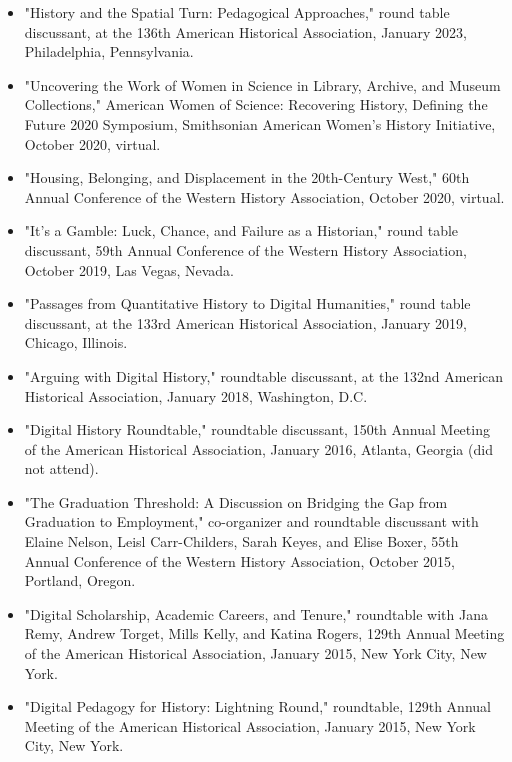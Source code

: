 \documentclass[10pt]{article}
\begin{document}
\begin{itemize}
  \item "History and the Spatial Turn: Pedagogical Approaches," round table discussant, at the 136th American Historical Association, January 2023, Philadelphia, Pennsylvania.
  
  \item "Uncovering the Work of Women in Science in Library, Archive, and Museum Collections," American Women of Science: Recovering History, Defining the Future 2020 Symposium, Smithsonian American Women's History Initiative, October 2020, virtual.
  
  \item "Housing, Belonging, and Displacement in the 20th-Century West," 60th Annual Conference of the Western History Association, October 2020, virtual.
  
  \item "It's a Gamble: Luck, Chance, and Failure as a Historian," round table discussant, 59th Annual Conference of the Western History Association, October 2019, Las Vegas, Nevada.
  
  \item "Passages from Quantitative History to Digital Humanities," round table discussant, at the 133rd American Historical Association, January 2019, Chicago, Illinois.
  
  \item "Arguing with Digital History," roundtable discussant, at the 132nd American Historical Association, January 2018, Washington, D.C.
  
  \item "Digital History Roundtable," roundtable discussant, 150th Annual Meeting of the American Historical Association, January 2016, Atlanta, Georgia (did not attend).
  
  \item "The Graduation Threshold: A Discussion on Bridging the Gap from Graduation to Employment," co-organizer and roundtable discussant with Elaine Nelson, Leisl Carr-Childers, Sarah Keyes, and Elise Boxer, 55th Annual Conference of the Western History Association, October 2015, Portland, Oregon.
  
  \item "Digital Scholarship, Academic Careers, and Tenure," roundtable with Jana Remy, Andrew Torget, Mills Kelly, and Katina Rogers, 129th Annual Meeting of the American Historical Association, January 2015, New York City, New York.
  
  \item "Digital Pedagogy for History: Lightning Round," roundtable, 129th Annual Meeting of the American Historical Association, January 2015, New York City, New York.
  

\end{itemize}
\end{document}
